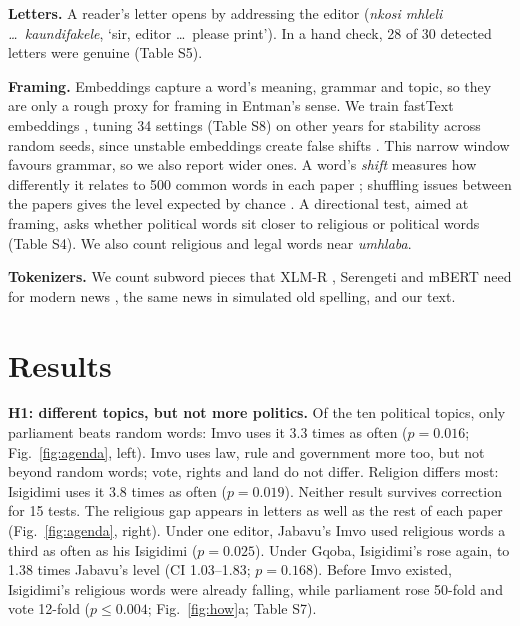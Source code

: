 \documentclass[10pt,letterpaper]{article}
\begin{document}
\textbf{Letters.} A reader's letter opens by addressing the editor (\emph{nkosi mhleli \dots\ kaundifakele}, `sir, editor \dots\ please print'). In a hand check, 28 of 30 detected letters were genuine (Table S5).

\textbf{Framing.} Embeddings capture a word's meaning, grammar and topic, so they are only a rough proxy for framing in Entman's sense. We train fastText embeddings \citep{bojanowski2017}, tuning 34 settings (Table S8) on other years for stability across random seeds, since unstable embeddings create false shifts \citep{antoniak2018}. This narrow window favours grammar, so we also report wider ones. A word's \emph{shift} measures how differently it relates to 500 common words in each paper \citep{hamilton2016b}; shuffling issues between the papers gives the level expected by chance \citep{dubossarsky2017}. A directional test, aimed at framing, asks whether political words sit closer to religious or political words (Table S4). We also count religious and legal words near \emph{umhlaba}.

\textbf{Tokenizers.} We count subword pieces that XLM-R \citep{conneau2020}, Serengeti \citep{adebara2023} and mBERT \citep{devlin2019} need for modern news \citep{adelani2023}, the same news in simulated old spelling, and our text.

\section{Results}
\textbf{H1: different topics, but not more politics.} Of the ten political topics, only parliament beats random words: Imvo uses it 3.3 times as often ($p=0.016$; Fig.~\ref{fig:agenda}, left). Imvo uses law, rule and government more too, but not beyond random words; vote, rights and land do not differ. Religion differs most: Isigidimi uses it 3.8 times as often ($p=0.019$). Neither result survives correction for 15 tests. The religious gap appears in letters as well as the rest of each paper (Fig.~\ref{fig:agenda}, right). Under one editor, Jabavu's Imvo used religious words a third as often as his Isigidimi ($p=0.025$). Under Gqoba, Isigidimi's rose again, to 1.38 times Jabavu's level (CI 1.03--1.83; $p=0.168$). Before Imvo existed, Isigidimi's religious words were already falling, while parliament rose 50-fold and vote 12-fold ($p\leq0.004$; Fig.~\ref{fig:how}a; Table S7).
\end{document}
